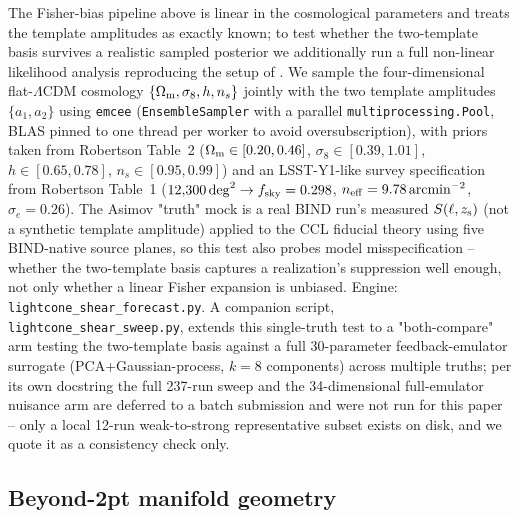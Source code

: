 \documentclass[11pt]{article}
\newcommand{\sez}{S(\ell, z_{\rm s})}
\begin{document}
The Fisher-bias pipeline above is linear in the cosmological parameters and
treats the template amplitudes as exactly known; to test whether the
two-template basis survives a realistic sampled posterior we additionally
run a full non-linear likelihood analysis reproducing the setup of
\citet{robertson2026}. We sample the four-dimensional flat-$\Lambda$CDM
cosmology $\{\Omega_{\rm m},\sigma_8,h,n_s\}$ jointly with the two template
amplitudes $\{a_1,a_2\}$ using \texttt{emcee} \citep{foremanMackey2013}
(\texttt{EnsembleSampler} with a parallel \texttt{multiprocessing.Pool},
BLAS pinned to one thread per worker to avoid oversubscription), with priors
taken from Robertson Table~2 ($\Omega_{\rm m}\in[0.20,0.46]$,
$\sigma_8\in[0.39,1.01]$, $h\in[0.65,0.78]$, $n_s\in[0.95,0.99]$) and an
LSST-Y1-like survey specification from Robertson Table~1
($12{,}300\,{\rm deg}^2\to f_{\rm sky}=0.298$, $n_{\rm eff}=9.78\,{\rm arcmin}^{-2}$,
$\sigma_e=0.26$). %
The Asimov "truth" mock is a real BIND run's measured $\sez$ (not a synthetic
template amplitude) applied to the CCL fiducial theory using five BIND-native
source planes, so this test also probes model misspecification -- whether the
two-template basis captures a realization's suppression well enough, not only
whether a linear Fisher expansion is unbiased. Engine:
\texttt{lightcone\_shear\_forecast.py}. A companion script,
\texttt{lightcone\_shear\_sweep.py}, extends this single-truth test to a
"both-compare" arm testing the two-template basis against a full 30-parameter
feedback-emulator surrogate (PCA+Gaussian-process, $k=8$ components) across
multiple truths; per its own docstring the full 237-run sweep and the 34-dimensional
full-emulator nuisance arm are deferred to a batch submission and were not
run for this paper -- only a local 12-run weak-to-strong representative
subset exists on disk, and we quote it as a consistency check only.

\subsection{Beyond-2pt manifold geometry}\label{sec:manifold}
\end{document}
